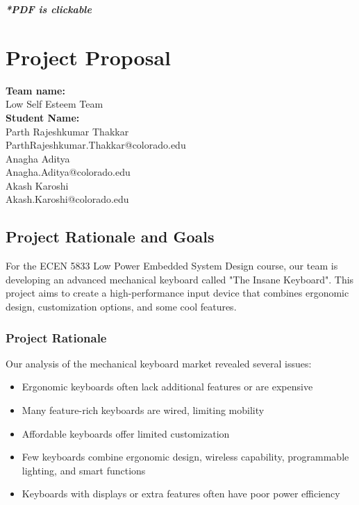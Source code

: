 \documentclass[a4paper,11pt]{article}%
\begin{document}


\pagebreak

\tableofcontents
\listoffigures
\listoftables
\vfill
\begin{center}
    \textbf{\textit{*PDF is clickable}}
\end{center}

\pagebreak


\section{\color{red}Project Proposal}



\textbf{Team name:}\\
Low Self Esteem Team\\

\textbf{Student Name:}\\
Parth Rajeshkumar Thakkar\\
ParthRajeshkumar.Thakkar@colorado.edu\\

Anagha Aditya\\
Anagha.Aditya@colorado.edu\\

Akash Karoshi\\
Akash.Karoshi@colorado.edu\\


\subsection{Project Rationale and Goals}
For the ECEN 5833 Low Power Embedded System Design course, our team is developing an advanced mechanical keyboard called "The Insane Keyboard". This project aims to create a high-performance input device that combines ergonomic design, customization options, and some cool features.


\subsubsection{Project Rationale}
Our analysis of the mechanical keyboard market revealed several issues:
\begin{itemize}
    \item Ergonomic keyboards often lack additional features or are expensive
    \item Many feature-rich keyboards are wired, limiting mobility
    \item Affordable keyboards offer limited customization
    \item Few keyboards combine ergonomic design, wireless capability, programmable lighting, and smart functions
    \item Keyboards with displays or extra features often have poor power efficiency
\end{itemize}
\end{document}
